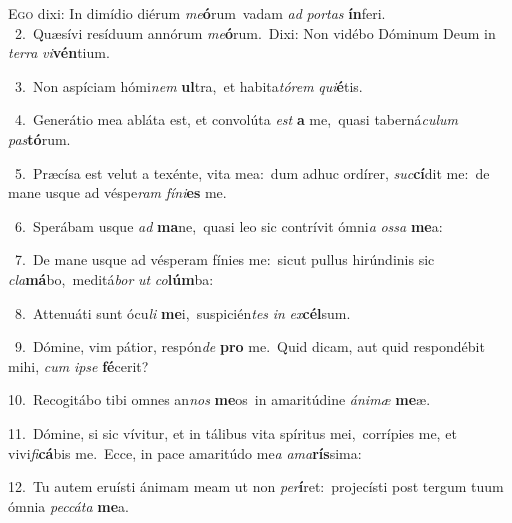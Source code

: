 \lettrine{\initial\textcolor{\initialcolor}{E}}{go} dixi: In dimídio diérum \textit{me}\-\textbf{ó}rum~\star vadam \textit{ad} \textit{por}\-\textit{tas} \textbf{ín}\-feri.\\
{\numbfont\textcolor{\numbcolor}{~2.}}~Quæsívi resíduum annórum \textit{me}\-\textbf{ó}rum.~\star Dixi: Non vidébo Dóminum Deum in \textit{ter}\-\textit{ra} \textit{vi}\-\textbf{vén}tium.\par
{\numbfont\textcolor{\numbcolor}{~3.}}~Non aspíciam hómi\textit{nem} \textbf{ul}\-tra,~\star et habita\-\textit{tó}\-\textit{rem} \textit{qui}\-\textbf{é}tis.\par
{\numbfont\textcolor{\numbcolor}{~4.}}~Generátio mea abláta est, et convolúta \textit{est} \textbf{a} me,~\star quasi taberná\-\textit{cu}\-\textit{lum} \textit{pas}\-\textbf{tó}rum.\par
{\numbfont\textcolor{\numbcolor}{~5.}}~Præcísa est velut a texénte, vita mea:~\dagger dum adhuc ordírer, \textit{suc}\-\textbf{cí}dit me:~\star de mane usque ad véspe\textit{ram} \textit{fí}\-\textit{ni}\textbf{es} me.\par
{\numbfont\textcolor{\numbcolor}{~6.}}~Sperábam usque \textit{ad} \textbf{ma}\-ne,~\star quasi leo sic contrívit ómni\textit{a} \textit{os}\-\textit{sa} \textbf{me}\-a:\par
{\numbfont\textcolor{\numbcolor}{~7.}}~De mane usque ad vésperam fínies me:~\dagger sicut pullus hirúndinis sic \textit{cla}\-\textbf{má}bo,~\star meditá\textit{bor} \textit{ut} \textit{co}\-\textbf{lúm}ba:\par
{\numbfont\textcolor{\numbcolor}{~8.}}~Attenuáti sunt ócu\textit{li} \textbf{me}\-i,~\star suspicién\textit{tes} \textit{in} \textit{ex}\-\textbf{cél}sum.\par
{\numbfont\textcolor{\numbcolor}{~9.}}~Dómine, vim pátior, respón\textit{de} \textbf{pro} me.~\star Quid dicam, aut quid respondébit mihi, \textit{cum} \textit{ip}\-\textit{se} \textbf{fé}\-cerit?\par
{\numbfont\textcolor{\numbcolor}{10.}}~Recogitábo tibi omnes an\textit{nos} \textbf{me}\-os~\star in amaritúdine \textit{á}\-\textit{ni}\textit{mæ} \textbf{me}\-æ.\par
{\numbfont\textcolor{\numbcolor}{11.}}~Dómine, si sic vívitur, et in tálibus vita spíritus mei,~\dagger corrípies me, et vivi\-\textit{fi}\-\textbf{cá}bis me.~\star Ecce, in pace amaritúdo me\textit{a} \textit{a}\-\textit{ma}\textbf{rís}sima:\par
{\numbfont\textcolor{\numbcolor}{12.}}~Tu autem eruísti ánimam meam ut non \textit{per}\-\textbf{í}ret:~\star projecísti post tergum tuum ómnia \textit{pec}\-\textit{cá}\textit{ta} \textbf{me}\-a.\par
